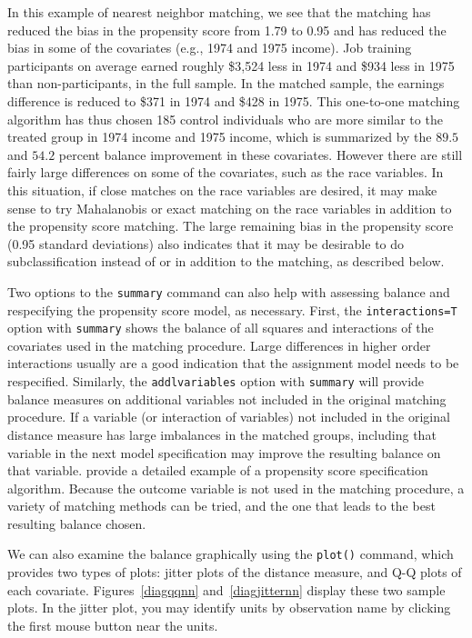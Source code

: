 \documentclass[oneside,letterpaper,titlepage]{article}
\begin{document}
\begin{enumerate}
In this example of nearest neighbor matching, we see that the matching
has reduced the bias in the propensity score from 1.79 to 0.95 and has
reduced the bias in some of the covariates (e.g., 1974 and 1975
income).  Job training participants on average earned roughly \$3,524
less in 1974 and \$934 less in 1975 than non-participants, in the full
sample.  In the matched sample, the earnings difference is reduced to
\$371 in 1974 and \$428 in 1975.  This one-to-one matching algorithm
has thus chosen 185 control individuals who are more similar to the
treated group in 1974 income and 1975 income, which is summarized by
the $89.5$ and $54.2$ percent balance improvement in these covariates.
However there are still fairly large differences on some of the
covariates, such as the race variables.  In this situation, if close
matches on the race variables are desired, it may make sense to try
Mahalanobis or exact matching on the race variables in addition to the
propensity score matching.  The large remaining bias in the propensity
score (0.95 standard deviations) also indicates that it may be
desirable to do subclassification instead of or in addition to the
matching, as described below.

Two options to the \texttt{summary} command can also help with
assessing balance and respecifying the propensity score model, as
necessary.  First, the {\tt interactions=T} option with {\tt summary}
shows the balance of all squares and interactions of the covariates
used in the matching procedure.  Large differences in higher order
interactions usually are a good indication that the assignment model
needs to be respecified.  Similarly, the {\tt addlvariables} option
with {\tt summary} will provide balance measures on additional
variables not included in the original matching procedure.  If a
variable (or interaction of variables) not included in the original
distance measure has large imbalances in the matched groups, including
that variable in the next model specification may improve the
resulting balance on that variable.  \cite{DehWah99} provide a
detailed example of a propensity score specification algorithm.
Because the outcome variable is not used in the matching procedure, a
variety of matching methods can be tried, and the one that leads to
the best resulting balance chosen.


We can also examine the balance graphically using the \texttt{plot()}
command, which provides two types of plots: jitter plots of the
distance measure, and Q-Q plots of each covariate.
Figures~\ref{diagqqnn} and~\ref{diagjitternn} display these two sample
plots.  In the jitter plot, you may identify units by observation name
by clicking the first mouse button near the units.


\end{enumerate}
\end{document}
